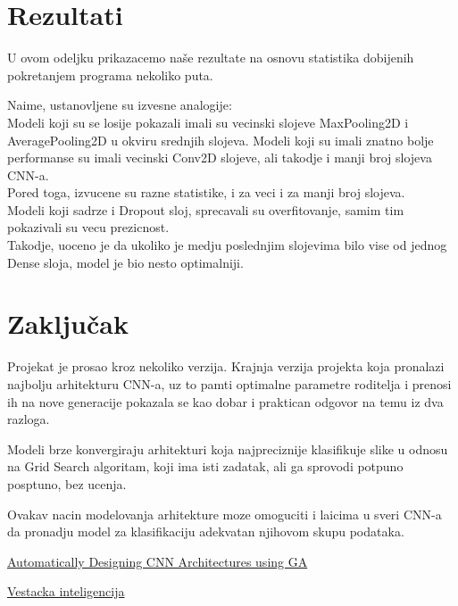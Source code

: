 \documentclass{article}
\begin{document}
\section{Rezultati}
U ovom odeljku prikazacemo naše rezultate na osnovu statistika dobijenih pokretanjem programa nekoliko puta.

Naime, ustanovljene su izvesne analogije: \\

Modeli koji su se losije pokazali imali su vecinski slojeve MaxPooling2D i AveragePooling2D u okviru srednjih slojeva.
Modeli koji su imali znatno bolje performanse su imali vecinski Conv2D slojeve, ali takodje i manji broj slojeva CNN-a. \\

Pored toga, izvucene su razne statistike, i za veci i za manji broj slojeva.\\

Modeli koji sadrze i Dropout sloj, sprecavali su overfitovanje, samim tim pokazivali su vecu prezicnost.\\

Takodje, uoceno je da ukoliko je medju poslednjim slojevima bilo vise od jednog Dense sloja, model je bio nesto optimalniji.




\section{Zaključak}
Projekat je prosao kroz nekoliko verzija. Krajnja verzija projekta koja pronalazi najbolju arhitekturu CNN-a, uz to pamti optimalne parametre roditelja i prenosi ih na nove generacije pokazala se kao dobar i praktican odgovor na temu iz dva razloga.

Modeli brze konvergiraju arhitekturi koja najpreciznije klasifikuje slike u odnosu na Grid Search algoritam, koji ima isti zadatak, ali ga sprovodi potpuno posptuno, bez ucenja.

Ovakav nacin modelovanja arhitekture moze omoguciti i laicima u sveri CNN-a da pronadju model za klasifikaciju adekvatan njihovom skupu podataka.
\\
\newpage
{}
\begin{thebibliography}{9}

\href{https://arxiv.org/pdf/1808.03818.pdf}{Automatically Designing CNN Architectures using GA }

\href{http://poincare.matf.bg.ac.rs/~janicic/}{Vestacka inteligencija}

\end{thebibliography}
\end{document}
